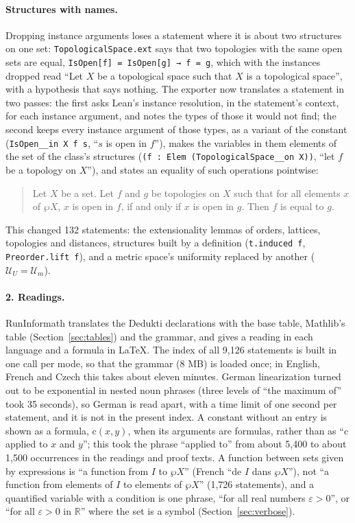 \documentclass{easychair}
\newcommand{\ttt}[1]{\texttt{#1}}
\newcommand{\reading}[1]{\begin{quote}\small #1\end{quote}}
\begin{document}
\paragraph{Structures with names.} Dropping instance arguments loses a statement where it is
about two structures on one set: \ttt{TopologicalSpace.ext} says that two topologies with the
same open sets are equal, \ttt{IsOpen[f] = IsOpen[g] → f = g}, which with the instances
dropped read ``Let $X$ be a topological space such that $X$ is a topological space'', with a
hypothesis that says nothing. The exporter now translates a statement in two passes: the first
asks Lean's instance resolution, in the statement's context, for each instance argument, and
notes the types of those it would not find; the second keeps every instance argument of those
types, as a variant of the constant (\ttt{IsOpen\_\_in X f s}, ``$s$ is open in $f$''), makes
the variables in them elements of the set of the class's structures
(\ttt{(f : Elem (TopologicalSpace\_\_on X))}, ``let $f$ be a topology on $X$''), and states an
equality of such operations pointwise:
\reading{Let $X$ be a set. Let $f$ and $g$ be topologies on $X$ such that for all elements $x$
of $\wp X$, $x$ is open in $f$, if and only if $x$ is open in $g$. Then $f$ is equal to $g$.}
\noindent This changed 132 statements: the extensionality lemmas of orders, lattices, topologies
and distances, structures built by a definition (\ttt{t.induced f}, \ttt{Preorder.lift f}), and a
metric space's uniformity replaced by another ($\mathcal{U}_U = \mathcal{U}_m$).

\paragraph{2. Readings.} RunInformath translates the Dedukti declarations with the base table,
Mathlib's table (Section~\ref{sec:tables}) and the grammar, and gives a reading in each language
and a formula in \LaTeX. The index of all 9,126 statements is built in one call per mode, so
that the grammar (8 MB) is loaded once; in English, French and Czech this takes about eleven
minutes. German linearization turned out to be exponential in nested noun phrases (three levels
of ``the maximum of'' took 35 seconds), so German is read apart, with a time limit of one second
per statement, and it is not in the present index. A constant without an entry is shown as a
formula, $\mathrm{c}(x, y)$, when its arguments are formulas, rather than as ``$\mathrm{c}$
applied to $x$ and $y$''; this took the phrase ``applied to'' from about 5,400 to about 1,500
occurrences in the readings and proof texts. A function between sets given by expressions is
``a function from $I$ to $\wp X$'' (French ``de $I$ dans $\wp X$''), not ``a function from
elements of $I$ to elements of $\wp X$'' (1,726 statements), and a quantified variable with a
condition is one phrase, ``for all real numbers $\varepsilon > 0$'', or ``for all $\varepsilon > 0$
in $\mathbb{R}$'' where the set is a symbol (Section~\ref{sec:verbose}).
\end{document}

